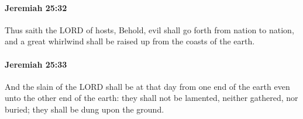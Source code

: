 		\paragraph{Jeremiah 25:32} %
			\label{JEREMIAH-25-32}

			Thus saith the LORD of hosts, Behold, evil shall go forth from nation to nation, and a great whirlwind shall be raised up from the coasts of the earth.


		\paragraph{Jeremiah 25:33} %
			\label{JEREMIAH-25-33}

			And the slain of the LORD shall be at that day from one end of the earth even unto the other end of the earth: they shall not be lamented, neither gathered, nor buried; they shall be dung upon the ground.


